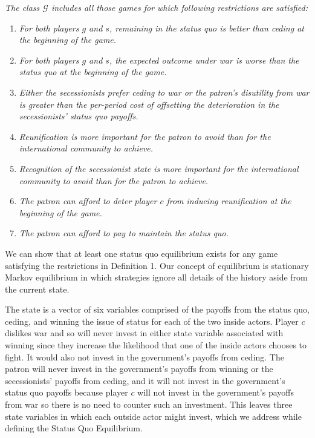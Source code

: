 \begin{definition}
\emph{The class $\mathcal{G}$ includes all those games for which following restrictions are satisfied:}

\begin{enumerate}
\item \textit{For both players $g$ and $s$, remaining in the status quo is better than ceding at the beginning of the game.}\label{res:1}

\item \textit{For both players $g$ and $s$, the expected outcome under war is worse than the status quo at the beginning of the game.}\label{res:2}

\item \textit{Either the secessionists prefer ceding to war or the patron's disutility from war is greater than the per-period cost of offsetting the deterioration in the secessionists' status quo payoffs.}\label{res:new}

\item \textit{Reunification is more important for the patron to avoid than for the international community to achieve.}\label{res:3}

\item  \textit{Recognition of the secessionist state is more important for the international community to avoid than for the patron to achieve.}\label{res:4}

\item  \textit{The patron can afford to deter player $c$ from inducing reunification at the beginning of the game.}\label{res:5}

\item \textit{The patron can afford to pay to maintain the status quo.}\label{res:6}

\end{enumerate}
\end{definition}

We can show that at least one status quo equilibrium exists for any game satisfying the restrictions in Definition 1. Our concept of equilibrium is stationary Markov equilibrium in which strategies ignore all details of the history aside from the current state.

The state is a vector of six variables comprised of the payoffs from the status quo, ceding, and winning the issue of status for each of the two inside actors. Player $c$ dislikes war and so will never invest in either state variable associated with winning since they increase the likelihood that one of the inside actors chooses to fight. It would also not invest in the government's payoffs from ceding. The patron will never invest in the government's payoffs from winning or the secessionists' payoffs from ceding, and it will not invest in the government's status quo payoffs because player $c$ will not invest in the government's payoffs from war so there is no need to counter such an investment. This leaves three state variables in which each outside actor might invest, which we address while defining the Status Quo Equilibrium. 

